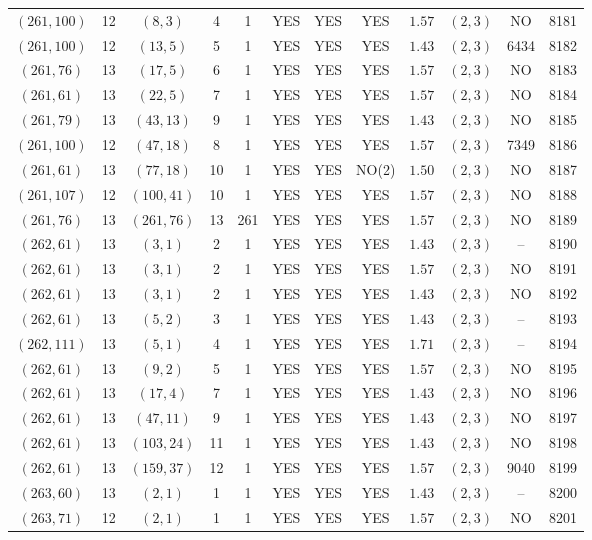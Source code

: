 \begin{longtable}{|c|c|c|c|c|c|c|c|c|c|c|c|}
$(261,100)$ & 12 & $(8,3)$ & 4 & 1 & YES & YES & YES & $1.57$ & $(2,3)$ & NO & 8181\\
$(261,100)$ & 12 & $(13,5)$ & 5 & 1 & YES & YES & YES & $1.43$ & $(2,3)$ & 6434 & 8182\\
$(261,76)$ & 13 & $(17,5)$ & 6 & 1 & YES & YES & YES & $1.57$ & $(2,3)$ & NO & 8183\\
$(261,61)$ & 13 & $(22,5)$ & 7 & 1 & YES & YES & YES & $1.57$ & $(2,3)$ & NO & 8184\\
$(261,79)$ & 13 & $(43,13)$ & 9 & 1 & YES & YES & YES & $1.43$ & $(2,3)$ & NO & 8185\\
$(261,100)$ & 12 & $(47,18)$ & 8 & 1 & YES & YES & YES & $1.57$ & $(2,3)$ & 7349 & 8186\\
$(261,61)$ & 13 & $(77,18)$ & 10 & 1 & YES & YES & NO(2) & $1.50$ & $(2,3)$ & NO & 8187\\
$(261,107)$ & 12 & $(100,41)$ & 10 & 1 & YES & YES & YES & $1.57$ & $(2,3)$ & NO & 8188\\
$(261,76)$ & 13 & $(261,76)$ & 13 & 261 & YES & YES & YES & $1.57$ & $(2,3)$ & NO & 8189\\
$(262,61)$ & 13 & $(3,1)$ & 2 & 1 & YES & YES & YES & $1.43$ & $(2,3)$ & -- & 8190\\
$(262,61)$ & 13 & $(3,1)$ & 2 & 1 & YES & YES & YES & $1.57$ & $(2,3)$ & NO & 8191\\
$(262,61)$ & 13 & $(3,1)$ & 2 & 1 & YES & YES & YES & $1.43$ & $(2,3)$ & NO & 8192\\
$(262,61)$ & 13 & $(5,2)$ & 3 & 1 & YES & YES & YES & $1.43$ & $(2,3)$ & -- & 8193\\
$(262,111)$ & 13 & $(5,1)$ & 4 & 1 & YES & YES & YES & $1.71$ & $(2,3)$ & -- & 8194\\
$(262,61)$ & 13 & $(9,2)$ & 5 & 1 & YES & YES & YES & $1.57$ & $(2,3)$ & NO & 8195\\
$(262,61)$ & 13 & $(17,4)$ & 7 & 1 & YES & YES & YES & $1.43$ & $(2,3)$ & NO & 8196\\
$(262,61)$ & 13 & $(47,11)$ & 9 & 1 & YES & YES & YES & $1.43$ & $(2,3)$ & NO & 8197\\
$(262,61)$ & 13 & $(103,24)$ & 11 & 1 & YES & YES & YES & $1.43$ & $(2,3)$ & NO & 8198\\
$(262,61)$ & 13 & $(159,37)$ & 12 & 1 & YES & YES & YES & $1.57$ & $(2,3)$ & 9040 & 8199\\
$(263,60)$ & 13 & $(2,1)$ & 1 & 1 & YES & YES & YES & $1.43$ & $(2,3)$ & -- & 8200\\
$(263,71)$ & 12 & $(2,1)$ & 1 & 1 & YES & YES & YES & $1.57$ & $(2,3)$ & NO & 8201\\

\end{longtable}
